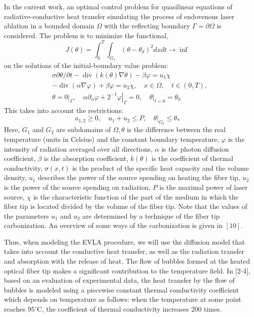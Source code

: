 \documentclass[10pt]{article}
\begin{document}
In the current work, an optimal control problem for quasilinear equations of radiative-conductive heat transfer simulating the process of endovenous laser ablation in a bounded domain $\Omega$ with the reflecting boundary $\Gamma=\partial \Omega$ is considered. The problem is to minimize the functional,
$$
J(\theta)=\int_{0}^{T} \int_{G_{1}}\left(\theta-\theta_{d}\right)^{2} d x d t \rightarrow \inf
$$
on the solutions of the initial-boundary value problem:
$$
\begin{aligned}
&\sigma \partial \theta / \partial t-\operatorname{div}(k(\theta) \nabla \theta)-\beta \varphi=u_{1} \chi \\
&-\operatorname{div}(\alpha \nabla \varphi)+\beta \varphi=u_{2} \chi, \quad x \in \Omega, \quad t \in(0, T), \\
&\theta=\left.0\right|_{\Gamma}, \quad \alpha \partial_{n} \varphi+\left.2^{-1} \varphi\right|_{\Gamma}=0,\left.\quad \theta\right|_{t=0}=\theta_{0}
\end{aligned}
$$
This takes into account the restrictions:
$$
u_{1,2} \geq 0, \quad u_{1}+u_{2} \leq P,\left.\quad \theta\right|_{G_{2}} \leq \theta_{*}
$$
Here, $G_{1}$ and $G_{2}$ are subdomains of $\Omega, \theta$ is the difference between the real temperature (units in Celsius) and the constant boundary temperature, $\varphi$ is the intensity of radiation averaged over all directions, $\alpha$ is the photon diffusion coefficient, $\beta$ is the absorption coefficient, $k(\theta)$ is the coefficient of thermal conductivity, $\sigma(x, t)$ is the product of the specific heat capacity and the volume density, $u_{1}$ describes the power of the source spending on heating the fiber tip, $u_{2}$ is the power of the source spending on radiation, $P$ is the maximal power of laser source, $\chi$ is the characteristic function of the part of the medium in which the fiber tip is located divided by the volume of the fiber tip. Note that the values of the parameters $u_{1}$ and $u_{2}$ are determined by a technique of the fiber tip carbonization. An overview of some ways of the carbonization is given in $[10]$.

Thus, when modeling the EVLA procedure, we will use the diffusion model that takes into account the conductive heat transfer, as well as the radiation transfer and absorption with the release of heat. The flow of bubbles formed at the heated optical fiber tip makes a significant contribution to the temperature field. In [2-4], based on an evaluation of experimental data, the heat transfer by the flow of bubbles is modeled using a piecewise constant thermal conductivity coefficient which depends on temperature as follows: when the temperature at some point reaches $95^{\circ} \mathrm{C}$, the coefficient of thermal conductivity increases 200 times.
\end{document}
